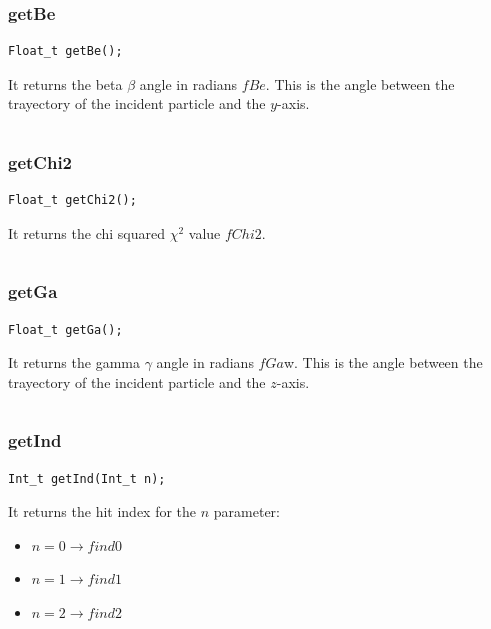 \documentclass[a4paper]{book}
\begin{document}
\subsubsection{getBe}

\begin{lstlisting}
Float_t getBe();
\end{lstlisting}

It returns the beta $\beta$ angle in radians $fBe$. This is the angle between the trayectory of the incident particle and the $y$-axis.

\[\]

\subsubsection{getChi2}

\begin{lstlisting}
Float_t getChi2();
\end{lstlisting}

It returns the chi squared $\chi^2$ value $fChi2$.

\[\]

\subsubsection{getGa}

\begin{lstlisting}
Float_t getGa();
\end{lstlisting}

It returns the gamma $\gamma$ angle in radians $fGa$w. This is the angle between the trayectory of the incident particle and the $z$-axis.

\[\]

\subsubsection{getInd}

\begin{lstlisting}
Int_t getInd(Int_t n);
\end{lstlisting}

It returns the hit index for the $n$ parameter:
\begin{itemize}
	\item $n = 0 \rightarrow find0$
	\item $n = 1 \rightarrow find1$
	\item $n = 2 \rightarrow find2$
\end{itemize}
\end{document}
